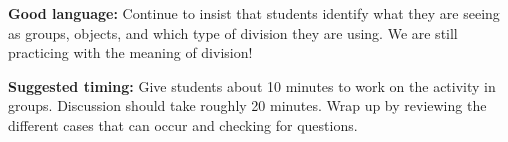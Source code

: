 \documentclass[nooutcomes,noauthor, handout]{ximera}
\begin{document}
\begin{instructorNotes}
{\bf Good language:} Continue to insist that students identify what they are seeing as groups, objects, and which type of division they are using. We are still practicing with the meaning of division!

{\bf Suggested timing:} Give students about 10 minutes to work on the activity in groups. Discussion should take roughly 20 minutes. Wrap up by reviewing the different cases that can occur and checking for questions.




\end{instructorNotes}
\end{document}
